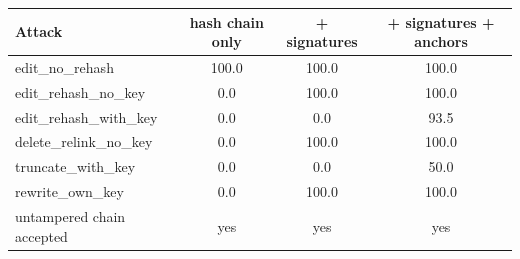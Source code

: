 \begin{tabular}{lccc}
\toprule
Attack & hash chain only & + signatures & + signatures + anchors \\
\midrule
edit\_no\_rehash & 100.0 & 100.0 & 100.0 \\
edit\_rehash\_no\_key & 0.0 & 100.0 & 100.0 \\
edit\_rehash\_with\_key & 0.0 & 0.0 & 93.5 \\
delete\_relink\_no\_key & 0.0 & 100.0 & 100.0 \\
truncate\_with\_key & 0.0 & 0.0 & 50.0 \\
rewrite\_own\_key & 0.0 & 100.0 & 100.0 \\
untampered chain accepted & yes & yes & yes \\
\bottomrule
\end{tabular}
